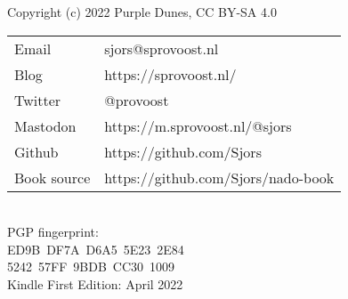 {\setlength{\parindent}{0cm}
Copyright (c) 2022 Purple Dunes, CC BY-SA 4.0\\

\begin{tabular}{@{} l l }
Email & sjors@sprovoost.nl \\
Blog & https://sprovoost.nl/ \\
Twitter & @provoost \\
Mastodon & https://m.sprovoost.nl/@sjors \\
Github & https://github.com/Sjors \\
Book source & https://github.com/Sjors/nado-book \\
\end{tabular}
\\

PGP fingerprint:\\
ED9B DF7A D6A5 5E23 2E84\\
5242 57FF 9BDB CC30 1009\\

Kindle First Edition: April 2022\\

}
\newpage
